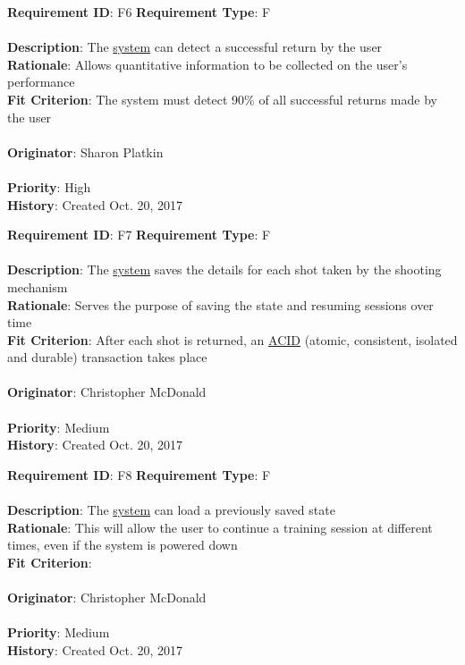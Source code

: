 \documentclass[11pt]{article}
\begin{document}
\begin{framed}
	\noindent\textbf{Requirement ID}: F6 \hfill \textbf{Requirement Type}: F \hfill\\\\
	\noindent\textbf{Description}: The \hyperref[sec:definitions]{system} can detect a successful return by the user \\
	\textbf{Rationale}: Allows quantitative information to be collected on the user's performance \\
	\textbf{Fit Criterion}: The system must detect 90\% of all successful returns made by the user\\\\
	\textbf{Originator}: Sharon Platkin \\\\
	\textbf{Priority}: High \hfill \\
	\noindent\textbf{History}: Created Oct. 20, 2017
\end{framed}

\begin{framed}
	\noindent\textbf{Requirement ID}: F7 \hfill \textbf{Requirement Type}: F \hfill\\\\
	\noindent\textbf{Description}: The \hyperref[sec:definitions]{system} saves the details for each shot taken by the shooting mechanism \\
	\textbf{Rationale}: Serves the purpose of saving the state and resuming sessions over time \\
	\textbf{Fit Criterion}: After each shot is returned, an \hyperref[sec:definitions]{ACID} (atomic, consistent, isolated and durable) transaction takes place \\\\
	\textbf{Originator}: Christopher McDonald \\\\
	\textbf{Priority}: Medium \hfill \\
	\noindent\textbf{History}: Created Oct. 20, 2017
\end{framed}

\begin{framed}
	\noindent\textbf{Requirement ID}: F8 \hfill \textbf{Requirement Type}: F \hfill\\\\
	\noindent\textbf{Description}: The \hyperref[sec:definitions]{system} can load a previously saved state \\
	\textbf{Rationale}: This will allow the user to continue a training session at different times, even if the system is powered down \\
	\textbf{Fit Criterion}: \\\\
	\textbf{Originator}: Christopher McDonald \\\\
	\textbf{Priority}: Medium \hfill \\
	\noindent\textbf{History}: Created Oct. 20, 2017
\end{framed}
\end{document}
